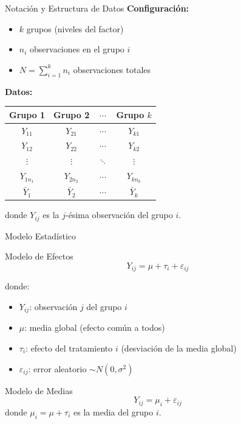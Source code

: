 \documentclass[10pt,aspectratio=169]{beamer}
\begin{document}
\begin{frame}{Notación y Estructura de Datos}
\textbf{Configuración:}
\begin{itemize}
    \item $k$ grupos (niveles del factor)
    \item $n_i$ observaciones en el grupo $i$
    \item $N = \sum_{i=1}^{k} n_i$ observaciones totales
\end{itemize}

\vspace{0.3cm}

\textbf{Datos:}
\begin{center}
\begin{tabular}{cccc}
\toprule
Grupo 1 & Grupo 2 & $\cdots$ & Grupo $k$ \\
\midrule
$Y_{11}$ & $Y_{21}$ & $\cdots$ & $Y_{k1}$ \\
$Y_{12}$ & $Y_{22}$ & $\cdots$ & $Y_{k2}$ \\
$\vdots$ & $\vdots$ & $\ddots$ & $\vdots$ \\
$Y_{1n_1}$ & $Y_{2n_2}$ & $\cdots$ & $Y_{kn_k}$ \\
\midrule
$\bar{Y}_1$ & $\bar{Y}_2$ & $\cdots$ & $\bar{Y}_k$ \\
\bottomrule
\end{tabular}
\end{center}

\vspace{0.3cm}
donde $Y_{ij}$ es la $j$-ésima observación del grupo $i$.
\end{frame}

\begin{frame}{Modelo Estadístico}
\begin{block}{Modelo de Efectos}
\begin{equation*}
Y_{ij} = \mu + \tau_i + \varepsilon_{ij}
\end{equation*}
\end{block}

donde:
\begin{itemize}
    \item $Y_{ij}$: observación $j$ del grupo $i$
    \item $\mu$: \alert{media global} (efecto común a todos)
    \item $\tau_i$: \alert{efecto del tratamiento $i$} (desviación de la media global)
    \item $\varepsilon_{ij}$: \alert{error aleatorio} $\sim N(0, \sigma^2)$
\end{itemize}

\vspace{0.3cm}

\begin{block}{Modelo de Medias}
\begin{equation*}
Y_{ij} = \mu_i + \varepsilon_{ij}
\end{equation*}
donde $\mu_i = \mu + \tau_i$ es la media del grupo $i$.
\end{block}
\end{frame}
\end{document}

